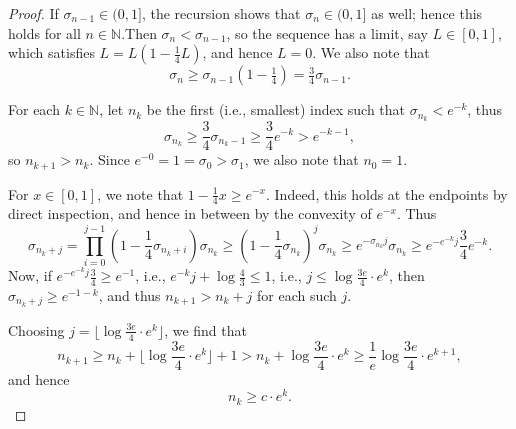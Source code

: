 \documentclass[11pt, reqno]{amsart}
\theoremstyle{definition}
\theoremstyle{remark}
\numberwithin{equation}{section}
\newcommand{\N}{\mathbb N}
\newcommand{\floor}[1]{\lfloor #1 \rfloor}
\begin{document}
\begin{proof}
If $\sigma_{n-1}\in(0,1]$, the recursion shows that $\sigma_n\in(0,1]$ as well; hence this holds for all $n\in\N$.Then $\sigma_n<\sigma_{n-1}$, so the sequence has a limit, say $L\in[0,1]$, which satisfies $L=L(1-\frac14 L)$, and hence $L=0$. We also note that
\begin{equation*}
  \sigma_n\geq\sigma_{n-1}(1-\tfrac14)=\tfrac34\sigma_{n-1}.
\end{equation*}

For each $k\in\N$, let $n_k$ be the first (i.e., smallest) index such that $\sigma_{n_k}<e^{-k}$, thus \begin{equation*}
  \sigma_{n_k}\geq \frac 34\sigma_{n_k-1}\geq \frac34 e^{-k}>e^{-k-1},
\end{equation*}
so $n_{k+1}>n_k$. Since $e^{-0}=1=\sigma_0>\sigma_1$, we also note that $n_0=1$.

For $x\in[0,1]$, we note that $1-\frac14 x\geq e^{-x}$. Indeed, this holds at the endpoints by direct inspection, and hence in between by the convexity of $e^{-x}$. Thus
\begin{equation*}
  \sigma_{n_k+j}=\prod_{i=0}^{j-1}(1-\frac14\sigma_{n_k+i})\sigma_{n_k}
  \geq(1-\frac14\sigma_{n_k})^j\sigma_{n_k}
  \geq e^{-\sigma_{n_k}j}\sigma_{n_k}
  \geq e^{-e^{-k}j}\frac34 e^{-k}.
\end{equation*}
Now, if $e^{-e^{-k}j}\frac34\geq e^{-1}$, i.e., $e^{-k}j+\log\frac{4}{3}\leq 1$, i.e., $j\leq \log\frac{3e}{4}\cdot e^k$, then $\sigma_{n_k+j}\geq e^{-1-k}$, and thus $n_{k+1}>n_k+j$ for each such $j$.

Choosing $j=\floor{\log\frac{3e}{4}\cdot e^k}$, we find that
\begin{equation*}
  n_{k+1}\geq n_k+\floor{\log\frac{3e}{4}\cdot e^k}+1>n_k+\log\frac{3e}{4}\cdot e^k
  \geq \frac{1}{e}\log\frac{3e}{4}\cdot e^{k+1},
\end{equation*}
and hence
\begin{equation*}
  n_k\geq c\cdot e^k.
\end{equation*}


\end{proof}
\end{document}
